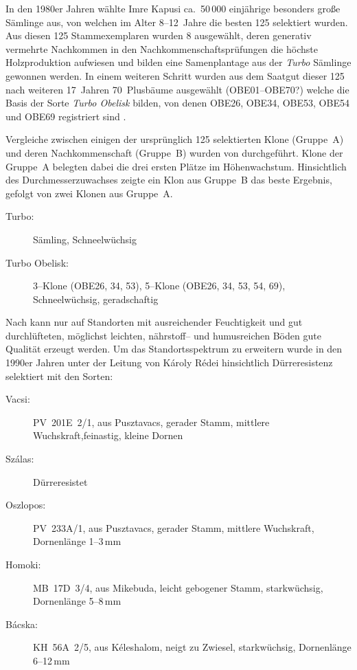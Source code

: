 \documentclass[twocolumn]{scrartcl}
\begin{document}
In den 1980er Jahren wählte Imre Kapusi ca.\ 50\,000 einjährige
besonders große Sämlinge aus, von welchen im Alter 8--12~Jahre die
besten 125 selektiert wurden. Aus diesen 125 Stammexemplaren wurden 8
ausgewählt, deren generativ vermehrte Nachkommen in den
Nachkommenschaftsprüfungen die höchste Holzproduktion aufwiesen und
bilden eine Samenplantage aus der \emph{Turbo} Sämlinge gewonnen
werden. In einem weiteren Schritt wurden aus dem Saatgut dieser 125
nach weiteren 17~Jahren 70~Plusbäume ausgewählt (OBE01--OBE70?) welche
die Basis der Sorte \emph{Turbo Obelisk} bilden, von denen OBE26,
OBE34, OBE53, OBE54 und OBE69 registriert sind
\citep{szabo2014turbo,nemeth2022robinie}.

Vergleiche zwischen einigen der ursprünglich 125 selektierten Klone
(Gruppe~A) und deren Nachkommenschaft (Gruppe~B) wurden von
\citet{barna2009robinieTurbo} durchgeführt. Klone der Gruppe~A
belegten dabei die drei ersten Plätze im Höhenwachstum. Hinsichtlich
des Durchmesserzuwachses zeigte ein Klon aus Gruppe~B das beste
Ergebnis, gefolgt von zwei Klonen aus Gruppe~A.

\begin{description}
  \item[Turbo:] Sämling, Schneelwüchsig \citep{nemeth2022robinie}
  \item[Turbo Obelisk:] 3--Klone (OBE26, 34, 53), 5--Klone (OBE26, 34, 53, 54, 69), Schneelwüchsig, geradschaftig \citep{nemeth2022robinie}
\end{description}

Nach \citet{redei2008robinieImprovement} kann nur auf Standorten mit
ausreichender Feuchtigkeit und gut durchlüfteten, möglichst leichten,
nährstoff-- und humusreichen Böden gute Qualität erzeugt werden. Um
das Standortsspektrum zu erweitern wurde in
den 1990er Jahren unter der Leitung von Károly Rédei
hinsichtlich Dürreresistenz selektiert mit den Sorten:

\begin{description}
  \item[Vacsi:] PV~201E~2/1, aus Pusztavacs, gerader Stamm, mittlere Wuchskraft,feinastig, kleine Dornen
  \item[Szálas:] Dürreresistet
  \item[Oszlopos:] PV~233A/1, aus Pusztavacs, gerader Stamm, mittlere Wuchskraft, Dornenlänge 1--3\,mm
  \item[Homoki:] MB~17D~3/4, aus Mikebuda, leicht gebogener Stamm, starkwüchsig, Dornenlänge 5--8\,mm
  \item[Bácska:] KH~56A~2/5, aus Kéleshalom, neigt zu Zwiesel, starkwüchsig, Dornenlänge 6--12\,mm
\end{description}
\end{document}
